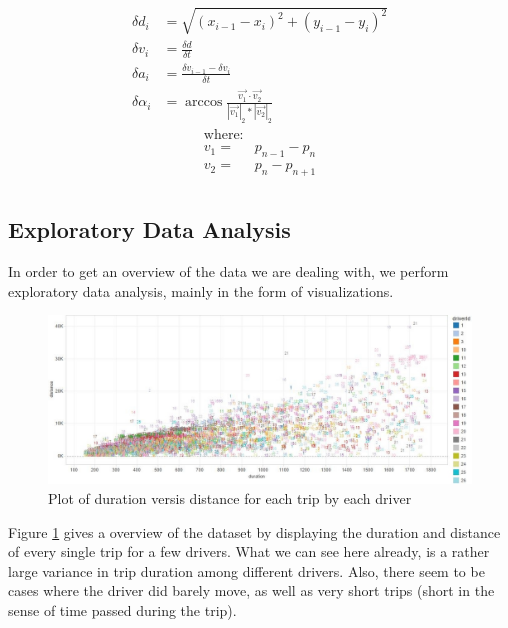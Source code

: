 \documentclass{vldb}
\begin{document}
\begin{align}
\delta d_i &= \sqrt{(x_{i-1} - x_{i})^2 + (y_{i-1} - y_{i})^2} \\
\delta v_i &= \frac{\delta d}{\delta t} \\
\delta a_i &= \frac{\delta v_{i-1} - \delta v_{i}}{\delta t} \\
\delta \alpha_i &= \arccos \frac{\vec{v_1} \cdot \vec{v_2}}{|\vec{v_1}|_2 * |\vec{v_2}|_2}
\end{align}
\begin{align*}
\text{where:}\\
v_1 =& p_{n-1} - p_{n} \\
v_2 =& p_{n} - p_{n+1}\\
\end{align*}


\subsection{Exploratory Data Analysis}
In order to get an overview of the data we are dealing with, we perform exploratory data analysis, mainly in the form of visualizations.

\begin{figure}
\centering
\includegraphics[width=\linewidth]{"pics/duration-vs-distance-driver"}
\caption{Plot of duration versis distance for each trip by each driver}
\label{fig:duration-vs-distance}
\end{figure}
Figure \ref{fig:duration-vs-distance} gives a overview of the dataset by displaying the duration and distance of every single trip for a few drivers. What we can see here already, is a rather large variance in trip duration among different drivers. Also, there seem to be cases where the driver did barely move, as well as very short trips (short in the sense of time passed during the trip).
\end{document}

